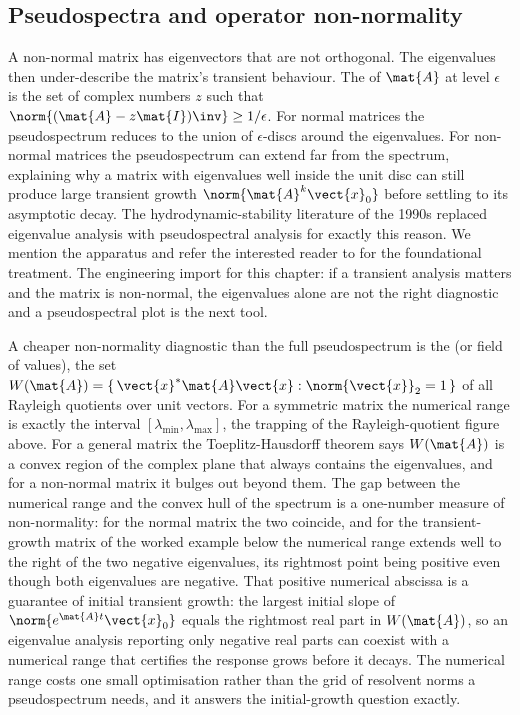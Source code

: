 \subsection{Pseudospectra and operator non-normality}

A non-normal matrix has eigenvectors that are not orthogonal. The
eigenvalues then under-describe the matrix's transient behaviour.
The  of $\mat{A}$ at level $\epsilon$ is the
set of complex numbers $z$ such that $\norm{(\mat{A} - z\mat{I})\inv}
\geq 1/\epsilon$. For normal matrices the pseudospectrum reduces to
the union of $\epsilon$-discs around the eigenvalues. For non-normal
matrices the pseudospectrum can extend far from the spectrum,
explaining why a matrix with eigenvalues well inside the unit disc
can still produce large transient growth $\norm{\mat{A}^{k}
\vect{x}_{0}}$ before settling to its asymptotic decay. The
hydrodynamic-stability literature of the 1990s replaced eigenvalue
analysis with pseudospectral analysis for exactly this reason. We
mention the apparatus and refer the interested reader to
\textcite{text:trefethen-bau1997} for the foundational treatment.
The engineering import for this chapter: if a transient analysis
matters and the matrix is non-normal, the eigenvalues alone are not
the right diagnostic and a pseudospectral plot is the next tool.

\begin{mastery}
A cheaper non-normality diagnostic than the full pseudospectrum is the
 (or field of values), the set
$W(\mat{A}) = \{\,\vect{x}^{*}\mat{A}\vect{x} : \norm{\vect{x}}_{2} =
1\,\}$ of all Rayleigh quotients over unit vectors. For a symmetric
matrix the numerical range is exactly the interval $[\lambda_{\min},
\lambda_{\max}]$, the trapping of the Rayleigh-quotient figure above.
For a general matrix the Toeplitz-Hausdorff theorem says $W(\mat{A})$
is a convex region of the complex plane that always contains the
eigenvalues, and for a non-normal matrix it bulges out beyond them. The
gap between the numerical range and the convex hull of the spectrum is
a one-number measure of non-normality: for the normal matrix the two
coincide, and for the transient-growth matrix of the worked example
below the numerical range extends well to the right of the two negative
eigenvalues, its rightmost point being positive even though both
eigenvalues are negative. That positive numerical abscissa is a
guarantee of initial transient growth: the largest initial slope of
$\norm{e^{\mat{A}t}\vect{x}_0}$ equals the rightmost real part in
$W(\mat{A})$, so an eigenvalue analysis reporting only negative real
parts can coexist with a numerical range that certifies the response
grows before it decays. The numerical range costs one small
optimisation rather than the grid of resolvent norms a pseudospectrum
needs, and it answers the initial-growth question exactly.
\end{mastery}

